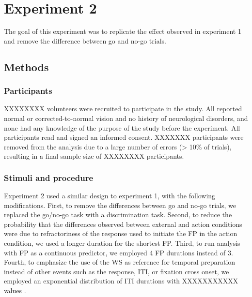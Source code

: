 \documentclass{article}
\begin{document}
\section{Experiment 2}

The goal of this experiment was to replicate the effect observed in experiment 1 and remove the difference between go and no-go trials.

\subsection{Methods}

\subsubsection{Participants}
XXXXXXXX volunteers were recruited to participate in the study. All reported normal or corrected-to-normal vision and no history of neurological disorders, and none had any knowledge of the purpose of the study before the experiment. All participants read and signed an informed consent. XXXXXXX participants were removed from the analysis due to a large number of errors (> 10\% of trials), resulting in a final sample size of XXXXXXXX participants.

\subsubsection{Stimuli and procedure}
Experiment 2 used a similar design to experiment 1, with the following modifications. First, to remove the differences between go and no-go trials, we replaced the go/no-go task with a discrimination task. Second, to reduce the probability that the differences observed between external and action conditions were due to refractoriness of the response used to initiate the FP in the action condition, we used a longer duration for the shortest FP. Third, to run analysis with FP as a continuous predictor, we employed 4 FP durations instead of 3. Fourth, to emphasize the use of the WS as reference for temporal preparation instead of other events such as the response, ITI, or fixation cross onset, we employed an exponential distribution of ITI durations with XXXXXXXXXXX values \cite{jepma_temporal_2012}. %
\end{document}
